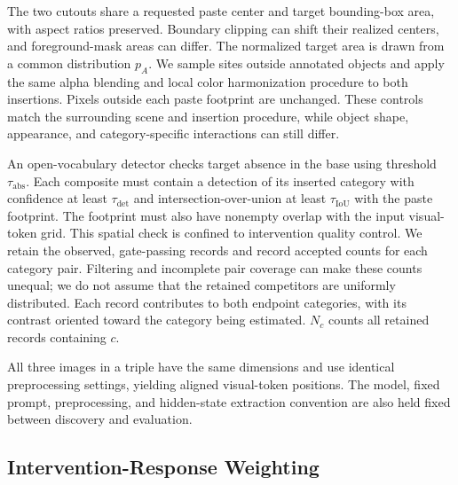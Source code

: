 The two cutouts share a requested paste center and target bounding-box
area, with aspect ratios preserved. Boundary clipping can shift their
realized centers, and foreground-mask areas can differ. The normalized
target area is drawn from a common distribution \(p_A\). We sample sites outside
annotated objects and apply the same alpha blending and local color
harmonization procedure to both insertions. Pixels outside each paste
footprint are unchanged. These controls match the surrounding scene and
insertion procedure, while object shape, appearance, and category-specific
interactions can still differ.

An open-vocabulary detector checks target absence in the base using
threshold \(\tau_{\mathrm{abs}}\). Each composite must contain a detection
of its inserted category with confidence at least
\(\tau_{\mathrm{det}}\) and intersection-over-union at least
\(\tau_{\mathrm{IoU}}\) with the paste footprint. The footprint must also
have nonempty overlap with the input visual-token grid. This spatial
check is confined to intervention quality control.
We retain the observed, gate-passing records and record accepted counts
for each category pair. Filtering and incomplete pair coverage can make
these counts unequal; we do not assume that the retained competitors are
uniformly distributed. Each record contributes to both endpoint categories,
with its contrast oriented toward the category being estimated.
\(N_c\) counts all retained records containing \(c\).

All three images in a triple have the same dimensions and use identical
preprocessing settings, yielding aligned visual-token positions.
The model, fixed prompt, preprocessing, and hidden-state extraction
convention are also held fixed between discovery and evaluation.

\subsection{Intervention-Response Weighting}
\label{sec:response_weighting}

